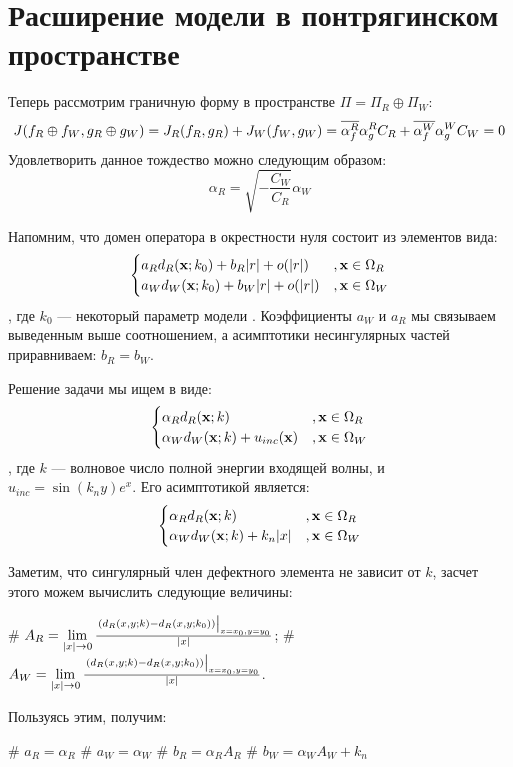 \section{Расширение модели в понтрягинском пространстве}
Теперь рассмотрим граничную форму в пространстве $\Pi = \Pi_R \oplus \Pi_W$:
\[
J(f_R \oplus f_W, g_R \oplus g_W) = J_R(f_R, g_R) + J_W(f_W, g_W) = \overline{\alpha^R_f} \alpha^R_g C_R + \overline{\alpha^W_f} \alpha^W_g C_W = 0
\]
Удовлетворить данное тождество можно следующим образом:
\[
\alpha_R = \sqrt{-\frac{C_W}{C_R}} \alpha_W
\]

Напомним, что домен оператора в окрестности нуля состоит из элементов вида:
\[
\begin{cases}
a_R d_R(\vb{x}; k_0) + b_R |r| + o(|r|)  &, \vb{x} \in \Omega_R \\
a_W d_W(\vb{x}; k_0) + b_W |r| + o(|r|)  &, \vb{x} \in \Omega_W \\
\end{cases}
\], где $k_0$ — некоторый параметр модели . Коэффициенты $a_W$ и $a_R$ мы связываем выведенным выше соотношением, а асимптотики несингулярных частей приравниваем: $b_R = b_W$.

Решение задачи мы ищем в виде:
\[
\begin{cases}
\alpha_R d_R(\vb{x}; k) &, \vb{x} \in \Omega_R \\
\alpha_W d_W(\vb{x}; k) + u_{inc}(\vb{x}) &, \vb{x} \in \Omega_W
\end{cases}
\], где $k$ — волновое число полной энергии входящей волны, и $u_{inc} = \sin(k_n y) e^{x}$. Его асимптотикой является:
\[
\begin{cases}
\alpha_R d_R(\vb{x}; k) &, \vb{x} \in \Omega_R \\
\alpha_W d_W(\vb{x}; k) + k_n |x| &, \vb{x} \in \Omega_W
\end{cases}
\]

Заметим, что сингулярный член дефектного элемента не зависит от $k$, засчет этого можем вычислить следующие величины:
\begin{ilist}
# $A_R = \lim\limits_{|x| \to 0} \frac{\eval{\left( d_R(x, y; k) - d_R(x, y; k_0) \right)}_{x = x_0, y = y_0}}{|x|}$;
# $A_W = \lim\limits_{|x| \to 0} \frac{\eval{\left( d_R(x, y; k) - d_R(x, y; k_0) \right)}_{x = x_0, y = y_0}}{|x|}$.
\end{ilist}

Пользуясь этим, получим:
\begin{ilist}
# $a_R = \alpha_R$
# $a_W = \alpha_W$
# $b_R = \alpha_R A_R$
# $b_W = \alpha_W A_W + k_n$
\end{ilist}

